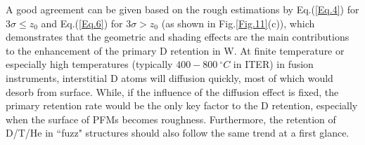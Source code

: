 A good agreement can be given based on the rough estimations by Eq.(\ref{Eq.4}) for $3 \sigma \leq z_0$ and Eq.(\ref{Eq.6}) for $3 \sigma > z_0$ (as shown in Fig.\ref{Fig.11}(c)), which demonstrates that the geometric and shading effects are the main contributions to the enhancement of the primary D retention in W. At finite temperature or especially high temperatures (typically $400 - 800~^\circ C$ in ITER\cite{Wirth:2014}) in fusion instruments, interstitial D atoms will diffusion quickly, most of which would desorb from surface. While, if the influence of the diffusion effect is fixed, the primary retention rate would be the only key factor to the D retention, especially when the surface of PFMs becomes roughness. Furthermore, the retention of D/T/He in ``fuzz" structures should also follow the same trend at a first glance.
